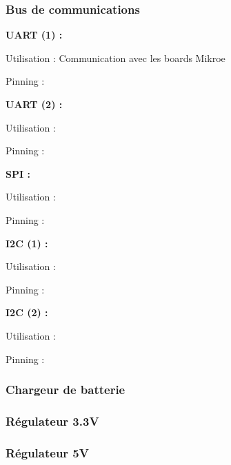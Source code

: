 {{		
	}

	\clearpage
	\subsubsection{Bus de communications}
	{
		\textbf{UART (1) :}
		
		Utilisation : Communication avec les boards Mikroe
		
		Pinning :
		
		\vspace{+5mm}
		
		\textbf{UART (2) :}
		
		Utilisation :
		
		Pinning :
		
		\vspace{+5mm}

		\textbf{SPI :}
		
		Utilisation :
		
		Pinning :
		
		\vspace{+5mm}
		
		\textbf{I2C (1) :}
		
		Utilisation :
		
		Pinning :
		
		\vspace{+5mm}

		\textbf{I2C (2) :}
		
		Utilisation :
		
		Pinning :
		
		\vspace{+5mm}

	}

	\clearpage
	\subsubsection{Chargeur de batterie} \label{sssec:BatCharger}
	{
		
	}
	
	\subsubsection{Régulateur 3.3V} \label{sssec:Reg3V3}
	{
		
	}
	
	\subsubsection{Régulateur 5V} \label{sssec:Reg5V}
	{
		
	}
	

}


\clearpage
